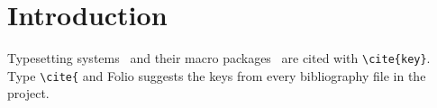 \section{Introduction}
Typesetting systems~\cite{knuth1984} and their macro packages~\cite{lamport1994}
are cited with \verb|\cite{key}|. Type \verb|\cite{| and Folio suggests the keys
from every bibliography file in the project.
